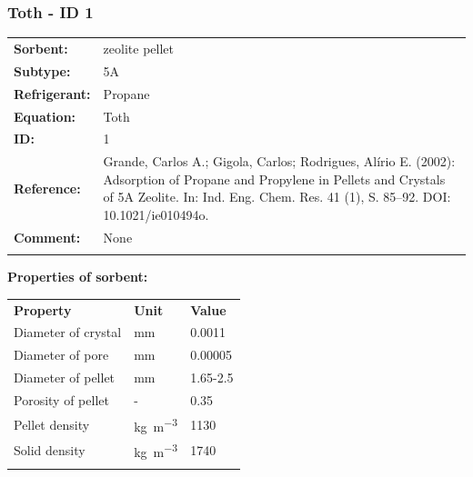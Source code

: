 \subsubsection{Toth - ID 1}
%
\begin{tabular}[l]{|lp{11.5cm}|}
\hline
\addlinespace

\textbf{Sorbent:} & zeolite pellet \\
\textbf{Subtype:} & 5A \\
\textbf{Refrigerant:} & Propane \\
\textbf{Equation:} & Toth \\
\textbf{ID:} & 1 \\
\textbf{Reference:} & Grande, Carlos A.; Gigola, Carlos; Rodrigues, Alírio E. (2002): Adsorption of Propane and Propylene in Pellets and Crystals of 5A Zeolite. In: Ind. Eng. Chem. Res. 41 (1), S. 85–92. DOI: 10.1021/ie010494o. \\
\textbf{Comment:} & None \\

\addlinespace
\hline
\end{tabular}
\newline

\textbf{Properties of sorbent:}
\newline
%
\begin{longtable}[l]{lll}
\toprule
\addlinespace
\textbf{Property} & \textbf{Unit} & \textbf{Value} \\
\addlinespace
\midrule
\endhead
\bottomrule
\endfoot
\bottomrule
\endlastfoot
\addlinespace

Diameter of crystal & \si{\milli\meter} & 0.0011\\
Diameter of pore & \si{\milli\meter} & 0.00005\\
Diameter of pellet & \si{\milli\meter} & 1.65-2.5\\
Porosity of pellet & - & 0.35\\
Pellet density & \si{\kilogram\per\cubic\meter} & 1130\\
Solid density & \si{\kilogram\per\cubic\meter} & 1740\\

\addlinespace\end{longtable}

